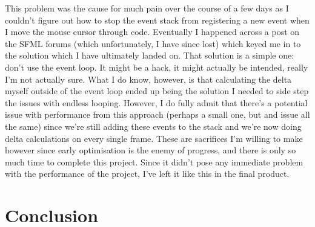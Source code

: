 \documentclass{article}
\begin{document}
This problem was the cause for much pain over the course of a few days as I
couldn't figure out how to stop the event stack from registering a new event
when I move the mouse cursor through code. Eventually I happened across a post
on the SFML forums (which unfortunately, I have since lost) which keyed me in to
the solution which I have ultimately landed on. That solution is a simple one:
don't use the event loop. It might be a hack, it might actually be intended,
really I'm not actually sure. What I do know, however, is that calculating the
delta myself outside of the event loop ended up being the solution I needed to
side step the issues with endless looping. However, I do fully admit that
there's a potential issue with performance from this approach (perhaps a small
one, but and issue all the same) since we're still adding these events to the
stack and we're now doing delta calculations on every single frame. These are
sacrifices I'm willing to make however since early optimisation is the enemy of
progress, and there is only so much time to complete this project. Since it
didn't pose any immediate problem with the performance of the project, I've
left it like this in the final product.

\section{Conclusion}
\end{document}
